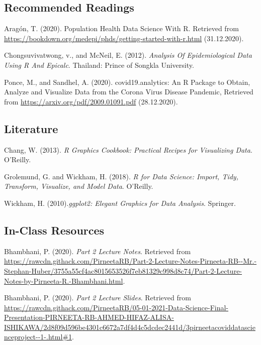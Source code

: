 \documentclass{article}
\begin{document}
\begin{thebibliography}{5}
\subsection*{Recommended Readings}
 Aragón, T. (2020). Population Health Data Science With R. Retrieved from \url{https://bookdown.org/medepi/phds/getting-started-with-r.html} (31.12.2020).

 Chongsuvivatwong, v., and McNeil, E. (2012). \textit{Analysis Of Epidemiological Data Using R And Epicalc}. Thailand: Prince of Songkla University.

 Ponce, M., and Sandhel, A. (2020). covid19.analytics: An R Package to Obtain, Analyze and Visualize Data from the Corona Virus Disease Pandemic, Retrieved from \url{https://arxiv.org/pdf/2009.01091.pdf} (28.12.2020).
 \\

\subsection*{Literature}
 Chang, W. (2013). \textit{R Graphics Cookbook: Practical Recipes for Visualizing Data}. O’Reilly.

 Grolemund, G. and Wickham, H. (2018). \textit{R for Data Science: Import, Tidy, Transform, Visualize, and Model Data}. O’Reilly.

 Wickham, H. (2010).\textit{ggplot2: Elegant Graphics for Data Analysis}. Springer.
 \\

\subsection*{In-Class Resources}
 Bhambhani, P. (2020).  \textit{Part 2 Lecture Notes}. Retrieved from \url{https://rawcdn.githack.com/PirneetaRB/Part-2-Lecture-Notes-Pirneeta-RB--Mr.-Stephan-Huber/3755a55cf4ac8015653526f7eb81329c998d8c74/Part-2-Lecture-Notes-by-Pirneeta-R.-Bhambhani.html}.

 Bhambhani, P. (2020). \textit{Part 2 Lecture Slides}. Retrieved from \url{https://rawcdn.githack.com/PirneetaRB/05-01-2021-Data-Science-Final-Presentation-PIRNEETA-RB-AHMED-HIFAZ-ALISA-ISHIKAWA/2d8f09d596be4301c6672a7df4d4c5dcdec2441d/3pirneetacoviddatascienceproject--1-.html#1}.


\end{thebibliography}
\end{document}
